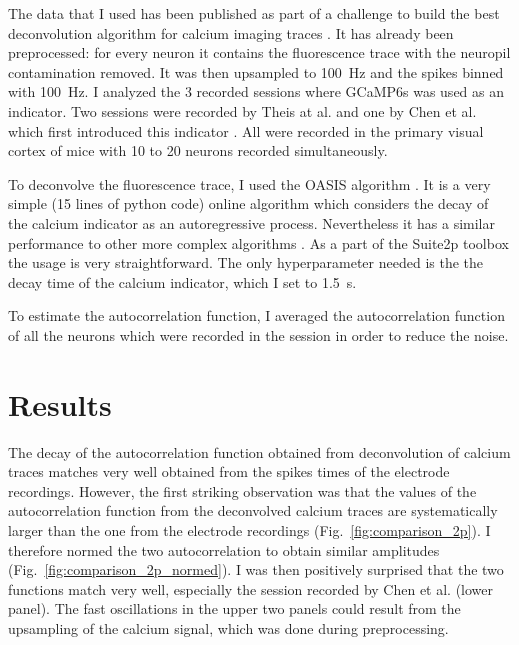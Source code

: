 \documentclass[12pt,a4paper,headinclude]{scrartcl}
\begin{document}
The data that I used has been published as part of a challenge to build the best deconvolution algorithm for calcium imaging traces \cite{noauthor_spikefinder_nodate, theis_benchmarking_2016}. It has already been  preprocessed: for every neuron it contains the fluorescence trace with the neuropil contamination removed. It was then upsampled to \SI{100}{Hz} and the spikes binned with \SI{100}{Hz}. I analyzed the 3 recorded sessions where GCaMP6s was used as an indicator. Two sessions were recorded by Theis at al. \cite{theis_benchmarking_2016} and one by Chen et al. which first introduced this indicator \cite{chen_ultrasensitive_2013}. All were recorded in the primary visual cortex of mice with 10 to 20 neurons recorded simultaneously.

To deconvolve the fluorescence trace, I used the OASIS algorithm \cite{friedrich_fast_2017}. It is a very simple (15 lines of python code) online algorithm which considers the decay of the calcium indicator as an autoregressive process. Nevertheless it has a similar performance to other more complex algorithms \cite{pachitariu_robustness_2018}. As a part of the Suite2p toolbox \cite{pachitariu_suite2p:_2017} the usage is very straightforward. The only hyperparameter needed is the the decay time of the calcium indicator, which I set to \SI{1.5}{s}. 

To estimate the autocorrelation function, I averaged the autocorrelation function of all the neurons which were recorded in the session in order to reduce the noise. 

\section{Results}

The decay of the autocorrelation function obtained from deconvolution of calcium traces matches very well obtained from the spikes times of the electrode recordings. However, the first striking observation was that the values of the autocorrelation function from the deconvolved calcium traces are systematically larger than the one from the electrode recordings (Fig.~\ref{fig:comparison_2p}). I therefore normed the two autocorrelation to obtain similar amplitudes (Fig.~\ref{fig:comparison_2p_normed}). I was then positively surprised that the two functions match very well, especially the session recorded by Chen et al. (lower panel). The fast oscillations in the upper two panels could result from the upsampling of the calcium signal, which was done during preprocessing. 
\end{document}
